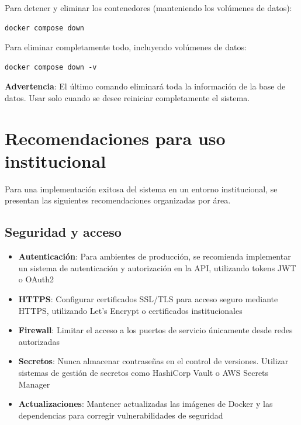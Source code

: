 Para detener y eliminar los contenedores (manteniendo los volúmenes de datos):

\begin{lstlisting}[style=bash]
docker compose down
\end{lstlisting}

Para eliminar completamente todo, incluyendo volúmenes de datos:

\begin{lstlisting}[style=bash]
docker compose down -v
\end{lstlisting}

\textbf{Advertencia}: El último comando eliminará toda la información de la base de datos. Usar solo cuando se desee reiniciar completamente el sistema.



\section{Recomendaciones para uso institucional}
\label{sec:chp7-6}

Para una implementación exitosa del sistema en un entorno institucional, se presentan las siguientes recomendaciones organizadas por área.

\subsection{Seguridad y acceso}
\label{subsec:chp7-6-1}

\begin{itemize}
    \item \textbf{Autenticación}: Para ambientes de producción, se recomienda implementar un sistema de autenticación y autorización en la API, utilizando tokens JWT o OAuth2
    \item \textbf{HTTPS}: Configurar certificados SSL/TLS para acceso seguro mediante HTTPS, utilizando Let's Encrypt o certificados institucionales
    \item \textbf{Firewall}: Limitar el acceso a los puertos de servicio únicamente desde redes autorizadas
    \item \textbf{Secretos}: Nunca almacenar contraseñas en el control de versiones. Utilizar sistemas de gestión de secretos como HashiCorp Vault o AWS Secrets Manager
    \item \textbf{Actualizaciones}: Mantener actualizadas las imágenes de Docker y las dependencias para corregir vulnerabilidades de seguridad
\end{itemize}

